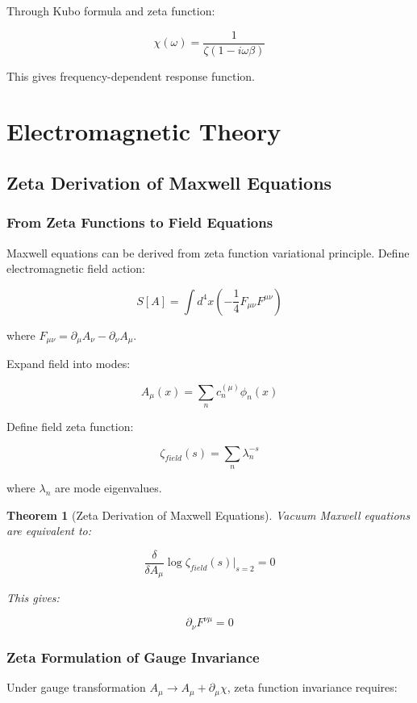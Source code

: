 \documentclass[12pt,a4paper]{article}
\newtheorem{theorem}{Theorem}[section]
\begin{document}
Through Kubo formula and zeta function:

$$\chi(\omega) = \frac{1}{\zeta(1-i\omega\beta)}$$

This gives frequency-dependent response function.

\section{Electromagnetic Theory}

\subsection{Zeta Derivation of Maxwell Equations}

\subsubsection{From Zeta Functions to Field Equations}

Maxwell equations can be derived from zeta function variational principle. Define electromagnetic field action:

$$S[A] = \int d^4x \left(-\frac{1}{4}F_{\mu\nu}F^{\mu\nu}\right)$$

where $F_{\mu\nu} = \partial_\mu A_\nu - \partial_\nu A_\mu$.

Expand field into modes:

$$A_\mu(x) = \sum_n c_n^{(\mu)} \phi_n(x)$$

Define field zeta function:

$$\zeta_{field}(s) = \sum_n \lambda_n^{-s}$$

where $\lambda_n$ are mode eigenvalues.

\begin{theorem}[Zeta Derivation of Maxwell Equations]
Vacuum Maxwell equations are equivalent to:

$$\frac{\delta}{\delta A_\mu} \log \zeta_{field}(s)\Big|_{s=2} = 0$$

This gives:

$$\partial_\nu F^{\nu\mu} = 0$$
\end{theorem}

\subsubsection{Zeta Formulation of Gauge Invariance}

Under gauge transformation $A_\mu \to A_\mu + \partial_\mu \chi$, zeta function invariance requires:
\end{document}
